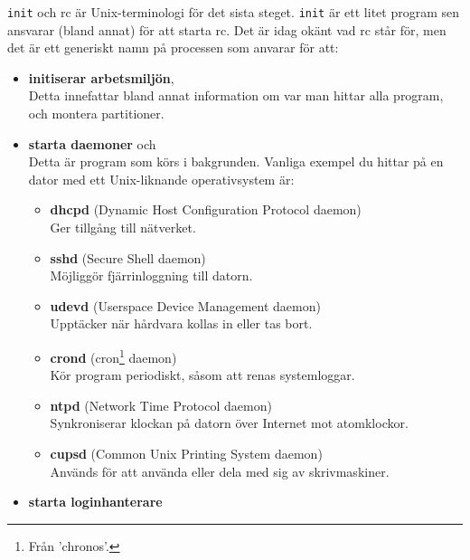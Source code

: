 \documentclass[12pt,a4paper]{article}
\begin{document}
\texttt{init} och rc är Unix-terminologi för det sista
steget. \texttt{init} är ett litet program sen ansvarar
(bland annat) för att starta rc. Det är idag okänt vad
rc står för, men det är ett generiskt namn på processen
som anvarar för att:
\begin{itemize}
\item \textbf{initiserar arbetsmiljön},\\
Detta innefattar bland annat information
om var man hittar alla program, och
montera partitioner.
\newpage
\item \textbf{starta daemoner} och\\
Detta är program som körs i bakgrunden.
Vanliga exempel du hittar på en dator
med ett Unix-liknande operativsystem är:
\begin{itemize}
\item \textbf{dhcpd} (Dynamic Host Configuration Protocol daemon)\\
Ger tillgång till nätverket.
\item \textbf{sshd} (Secure Shell daemon)\\
Möjliggör fjärrinloggning till datorn.
\item \textbf{udevd} (Userspace Device Management daemon)\\
Upptäcker när hårdvara kollas in eller tas bort.
\item \textbf{crond} (cron\footnote{Från 'chronos'.} daemon)\\
Kör program periodiskt, såsom att renas systemloggar.
\item \textbf{ntpd} (Network Time Protocol daemon)\\
Synkroniserar klockan på datorn över Internet mot atomklockor.
\item \textbf{cupsd} (Common Unix Printing System daemon)\\
Används för att använda eller dela med sig av skrivmaskiner.
\end{itemize}
\item \textbf{starta loginhanterare}
\end{itemize}
\end{document}
